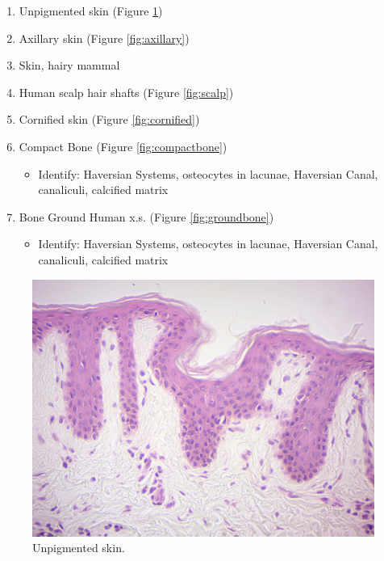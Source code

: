 \begin{enumerate}
\def\labelenumi{\arabic{enumi}.}
\tightlist
\item
  Unpigmented skin (Figure \ref{fig:unpigmented})
\item
  Axillary skin (Figure \ref{fig:axillary})
\item
  Skin, hairy mammal
\item
  Human scalp hair shafts (Figure \ref{fig:scalp})
\item
  Cornified skin (Figure \ref{fig:cornified})
\item
  Compact Bone (Figure \ref{fig:compactbone})

  \begin{itemize}
  \tightlist
  \item
    Identify: Haversian Systems, osteocytes in lacunae, Haversian Canal,
    canaliculi, calcified matrix
  \end{itemize}
\item
  Bone Ground Human x.s. (Figure \ref{fig:groundbone})

  \begin{itemize}
  \tightlist
  \item
    Identify: Haversian Systems, osteocytes in lacunae, Haversian Canal,
    canaliculi, calcified matrix
  \end{itemize}
\end{enumerate}

\begin{figure}

{\centering \includegraphics[width=0.7\linewidth]{./figures/anatomy/unpigmented_skin}

}

\caption{Unpigmented skin.}\label{fig:unpigmented}
\end{figure}

